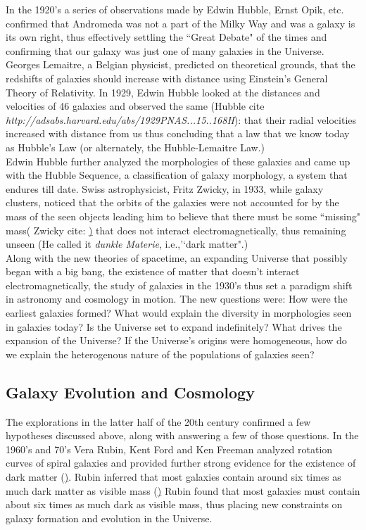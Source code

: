 In the 1920's a series of observations made by Edwin Hubble, Ernst Opik, etc. confirmed that Andromeda was not a part of the Milky Way and was a galaxy is its own right, thus effectively settling the ``Great Debate" of the times and confirming that our galaxy was just one of many galaxies in the Universe. Georges Lemaitre, a Belgian physicist, predicted on theoretical grounds, that the redshifts of galaxies should increase with distance using Einstein's General Theory of Relativity. In 1929, Edwin Hubble looked at the distances and velocities of 46 galaxies and observed the same (Hubble cite \emph{http://adsabs.harvard.edu/abs/1929PNAS...15..168H}): that their radial velocities increased with distance from us thus concluding that a law that we know today as Hubble's Law (or alternately, the Hubble-Lemaitre Law.)\\

Edwin Hubble further analyzed the morphologies of these galaxies and came up with the Hubble Sequence, a classification of galaxy morphology, a system that endures till date. Swiss astrophysicist, Fritz Zwicky, in 1933, while galaxy clusters, noticed that the orbits of the galaxies were not accounted for by the mass of the seen objects leading him to believe that there must be some ``missing" mass( Zwicky cite: \href{http://adsabs.harvard.edu/abs/1937ApJ....86..217Z}) that does not interact electromagnetically, thus remaining unseen (He called it \emph{dunkle Materie}, i.e.,'`dark matter".)\\

 Along with the new theories of spacetime, an expanding Universe that possibly began with a big bang, the existence of matter that doesn't interact electromagnetically, the study of galaxies in the 1930's thus set a paradigm shift in astronomy and cosmology in motion. The new questions were: How were the earliest galaxies formed? What would explain the diversity in morphologies seen in galaxies today? Is the Universe set to expand indefinitely? What drives the expansion of the Universe? If the Universe's origins were homogeneous, how do we explain the heterogenous nature of the populations of galaxies seen? 

\subsection{Galaxy Evolution and Cosmology}

The explorations in the latter half of the 20th century confirmed a few hypotheses discussed above, along with answering a few of those questions. In the 1960's and 70's Vera Rubin, Kent Ford and Ken Freeman analyzed rotation curves of spiral galaxies and provided further strong evidence for the existence of dark matter (\href{http://adsabs.harvard.edu/abs/1970ApJ...160..811F}). Rubin inferred that most galaxies contain around six times as much dark matter as visible mass (\href{http://adsabs.harvard.edu/abs/1980ApJ...238..471R})
Rubin found that most galaxies must contain about six times as much dark as visible mass, thus placing new constraints on galaxy formation and evolution in the Universe.\\

